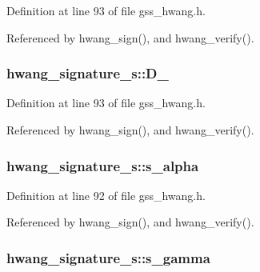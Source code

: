 Definition at line 93 of file gss\-\_\-hwang.\-h.



Referenced by hwang\-\_\-sign(), and hwang\-\_\-verify().

\hypertarget{structhwang__signature__s_aaecc7ad706fa2118065f64c6584f9d12}{
\subsubsection[{D\-\_\-3}]{ hwang\-\_\-signature\-\_\-s\-::\-D\-\_}}\label{structhwang__signature__s_aaecc7ad706fa2118065f64c6584f9d12}


Definition at line 93 of file gss\-\_\-hwang.\-h.



Referenced by hwang\-\_\-sign(), and hwang\-\_\-verify().

\hypertarget{structhwang__signature__s_aaa360f917bb1fb233784b0533a3b0d01}{
\subsubsection[{s\-\_\-alpha}]{ hwang\-\_\-signature\-\_\-s\-::s\-\_\-alpha}}\label{structhwang__signature__s_aaa360f917bb1fb233784b0533a3b0d01}


Definition at line 92 of file gss\-\_\-hwang.\-h.



Referenced by hwang\-\_\-sign(), and hwang\-\_\-verify().

\hypertarget{structhwang__signature__s_af0a04dad7e61ce5793dbfb6c775affee}{
\subsubsection[{s\-\_\-gamma}]{ hwang\-\_\-signature\-\_\-s\-::s\-\_\-gamma}}\label{structhwang__signature__s_af0a04dad7e61ce5793dbfb6c775affee}


